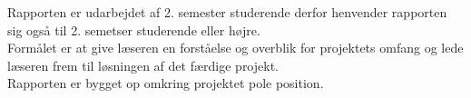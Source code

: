 
Rapporten er udarbejdet af 2. semester studerende derfor henvender rapporten sig også til 2. semetser studerende eller højre. \\
Formålet er at give læseren en forståelse og overblik for projektets omfang og lede læseren frem til løsningen af det færdige projekt.\\
Rapporten er bygget op omkring projektet pole position.\\ 
